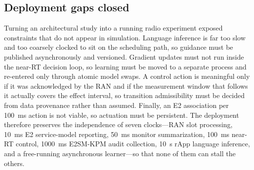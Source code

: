 \subsection{Deployment gaps closed}
Turning an architectural study into a running radio experiment exposed constraints that do not appear in simulation. Language inference is far too slow and too coarsely clocked to sit on the scheduling path, so guidance must be published asynchronously and versioned. Gradient updates must not run inside the near-RT decision loop, so learning must be moved to a separate process and re-entered only through atomic model swaps. A control action is meaningful only if it was acknowledged by the RAN and if the measurement window that follows it actually covers the effect interval, so transition admissibility must be decided from data provenance rather than assumed. Finally, an E2 association per 100~ms action is not viable, so actuation must be persistent. The deployment therefore preserves the independence of seven clocks---RAN slot processing, 10~ms E2 service-model reporting, 50~ms monitor summarization, 100~ms near-RT control, 1000~ms E2SM-KPM audit collection, 10~s rApp language inference, and a free-running asynchronous learner---so that none of them can stall the others.

